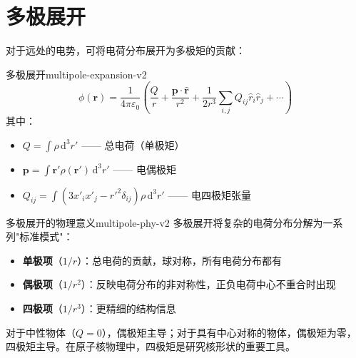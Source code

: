 \documentclass[11pt,a4paper,openany,oneside]{book}
\newcommand{\diff}{\mathrm{d}}
\newcommand{\eps}{\varepsilon}
\newcommand{\vect}[1]{\bm{#1}}
\newcommand{\unitvec}[1]{\hat{\vect{#1}}}
\begin{document}
\section{多极展开}

对于远处的电势，可将电荷分布展开为多极矩的贡献：

\begin{theorem}{多极展开}{multipole-expansion-v2}
\[
\phi(\vect{r}) = \frac{1}{4\pi\eps_0}\left(\frac{Q}{r} + \frac{\vect{p}\cdot\unitvec{r}}{r^2} + \frac{1}{2r^3}\sum_{i,j} Q_{ij}\hat{r}_i\hat{r}_j + \cdots\right)
\]
其中：
\begin{itemize}
\item $Q = \int\rho\,\diff^3r'$ —— 总电荷（单极矩）
\item $\vect{p} = \int\vect{r}'\rho(\vect{r}')\,\diff^3r'$ —— 电偶极矩
\item $Q_{ij} = \int(3x'_i x'_j - r'^2\delta_{ij})\rho\,\diff^3r'$ —— 电四极矩张量
\end{itemize}
\end{theorem}

\begin{insight}{多极展开的物理意义}{multipole-phy-v2}
多极展开将复杂的电荷分布分解为一系列"标准模式"：
\begin{itemize}
\item \textbf{单极项}（$1/r$）：总电荷的贡献，球对称，所有电荷分布都有
\item \textbf{偶极项}（$1/r^2$）：反映电荷分布的非对称性，正负电荷中心不重合时出现
\item \textbf{四极项}（$1/r^3$）：更精细的结构信息
\end{itemize}
对于中性物体（$Q=0$），偶极矩主导；对于具有中心对称的物体，偶极矩为零，四极矩主导。在原子核物理中，四极矩是研究核形状的重要工具。
\end{insight}
\end{document}
